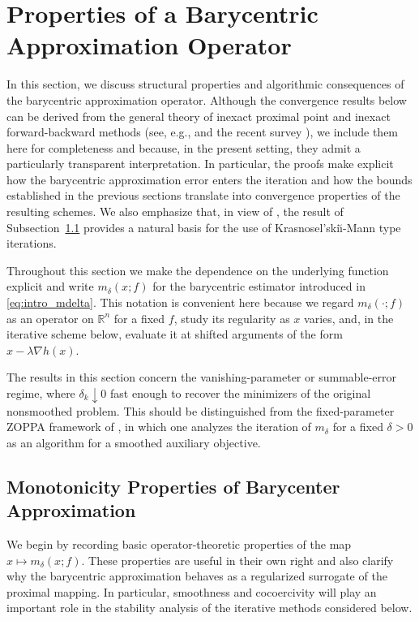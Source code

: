 \documentclass[11pt]{article}
\newcommand{\1}{\mathds{1}}
\theoremstyle{definition}
\theoremstyle{remark}
\theoremstyle{definition}
\begin{document}
\section{Properties of a Barycentric Approximation Operator}\label{monotone-prox}
In this section, we discuss structural properties and algorithmic consequences of the barycentric approximation operator. Although the convergence results below can be derived from the general theory of inexact proximal point and inexact forward-backward methods (see, e.g., \cite{MR410483,MR1871872} and the recent survey \cite{LS2026}), we include them here for completeness and because, in the present setting, they admit a particularly transparent interpretation. In particular, the proofs make explicit how the barycentric approximation error enters the iteration and how the bounds established in the previous sections translate into convergence properties of the resulting schemes. We also emphasize that, in view of \cite{MR3942891}, the result of Subsection~\ref{monotonicity-sec} provides a natural basis for the use of Krasnosel'ski\u{\i}-Mann type iterations.

Throughout this section we make the dependence on the underlying function explicit and write $m_\delta(x;f)$ for the barycentric estimator introduced in \eqref{eq:intro_mdelta}. This notation is convenient here because we regard $m_\delta(\cdot;f)$ as an operator on $\mathbb{R}^n$ for a fixed $f$, study its regularity as $x$ varies, and, in the iterative scheme below, evaluate it at shifted arguments of the form $x-\lambda\nabla h(x)$.

The results in this section concern the vanishing-parameter or summable-error regime, where \(\delta_k\downarrow0\) fast enough to recover the minimizers of the original nonsmoothed problem. This should be distinguished from the fixed-parameter ZOPPA framework of \cite{NaldiLabarriereMolinariVilla2026}, in which one analyzes the iteration of \(m_\delta\) for a fixed \(\delta>0\) as an algorithm for a smoothed auxiliary objective.

\subsection{Monotonicity Properties of Barycenter Approximation}\label{monotonicity-sec}
 We begin by recording basic operator-theoretic properties of the map
\(x\mapsto m_\delta(x;f)\). These properties are useful in their own right and also clarify why the barycentric approximation behaves as a regularized surrogate of the proximal mapping. In particular, smoothness and cocoercivity will play an important role in the stability analysis of the iterative methods considered below.
\end{document}
